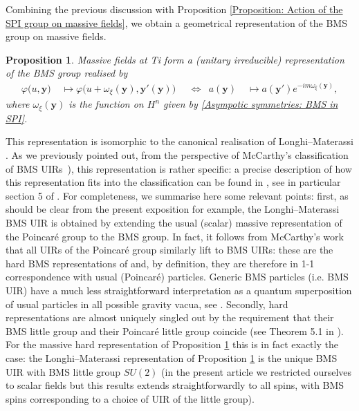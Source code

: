 \documentclass[a4paper, 10pt]{article}
\newtheorem{proposition}{Proposition}[section]
\theoremstyle{remark}
\newcommand{\correc}[1]{#1}
\newcommand{\y}{\bm{y}}
\begin{document}
Combining the previous discussion with Proposition \ref{Proposition: Action of the SPI group on massive fields}, we obtain a geometrical representation of the BMS group on massive fields.
\begin{proposition}\label{Proposition: Action of the BMS group on massive fields}
    Massive fields at Ti form a (unitary irreducible) representation of the BMS group realised by
    \begin{align*}
      \varphi\big(u, \y\big) &\;\mapsto   \varphi\big(u +\omega_{\xi}(\y), \y'(\y)\big) && \Longleftrightarrow &  a(\y) &\;\mapsto a(\y') e^{-im \omega_{\xi}(\y)},
   \end{align*}
   where $\omega_{\xi}(\y)$ is the function on $H^n$ given by \eqref{Asympotic symmetries: BMS in SPI}.
\end{proposition}
This representation is isomorphic to the canonical realisation of Longhi--Materassi \cite{Longhi:1997zt}. \correc{As we previously pointed out, from the perspective of McCarthy's classification of BMS UIRs~\cite{Mccarthy:1972ry,McCarthy_72-I,McCarthy_73-II,McCarthy_73-III,McCarthy_76-IV,McCarthy_75,McCarthy_78,McCarthy_78errata,Girardello:1974sq}), this representation is rather specific: a precise description of how this representation fits into the classification can be found in \cite{Bekaert:2024jxs,Bekaert:2025kjb}, see in particular section 5 of \cite{Bekaert:2025kjb}. For completeness, we summarise here some relevant points: first, as should be clear from the present exposition for example, the Longhi--Materassi BMS UIR is obtained by extending the usual (scalar) massive representation of the Poincaré group to the BMS group. In fact, it follows from McCarthy's work that all UIRs of the Poincaré group similarly lift to BMS UIRs: these are the hard BMS representations of \cite{Bekaert:2024jxs,Bekaert:2025kjb} and, by definition, they are therefore in 1-1 correspondence with usual (Poincaré) particles. Generic BMS particles (i.e. BMS UIR) have a much less straightforward interpretation as a quantum superposition of usual particles in all possible gravity vacua, see \cite{Bekaert:2024jxs}. Secondly, hard representations are almost uniquely singled out by the requirement that their BMS little group and their Poincaré little group coincide (see Theorem 5.1 in \cite{Bekaert:2025kjb}). For the massive hard representation of Proposition \ref{Proposition: Action of the BMS group on massive fields} this is in fact exactly the case: the Longhi--Materassi representation of Proposition \ref{Proposition: Action of the BMS group on massive fields} is the unique BMS UIR with BMS little group $SU(2)$ (in the present article we restricted ourselves to scalar fields but this results extends straightforwardly to all spins, with BMS spins corresponding to a choice of UIR of the little group).}
\end{document}
